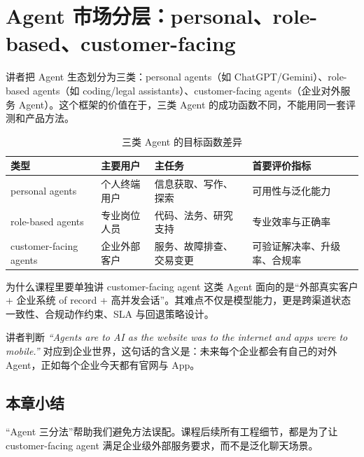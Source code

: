 \section{Agent 市场分层：personal、role-based、customer-facing}

讲者把 Agent 生态划分为三类：personal agents（如 ChatGPT/Gemini）、role-based agents（如 coding/legal assistants）、customer-facing agents（企业对外服务 Agent）。这个框架的价值在于，三类 Agent 的成功函数不同，不能用同一套评测和产品方法。

\begin{table}[H]
\centering
\caption{三类 Agent 的目标函数差异}
\begin{tabularx}{\textwidth}{>{\raggedright\arraybackslash}p{2.8cm} >{\raggedright\arraybackslash}p{3.2cm} >{\raggedright\arraybackslash}X >{\raggedright\arraybackslash}p{3.2cm}}
\toprule
类型 & 主要用户 & 主任务 & 首要评价指标 \\
\midrule
personal agents & 个人终端用户 & 信息获取、写作、探索 & 可用性与泛化能力 \\
role-based agents & 专业岗位人员 & 代码、法务、研究支持 & 专业效率与正确率 \\
customer-facing agents & 企业外部客户 & 服务、故障排查、交易变更 & 可验证解决率、升级率、合规率 \\
\bottomrule
\end{tabularx}
\end{table}

\begin{knowledgebox}{为什么课程里要单独讲 customer-facing agent}
这类 Agent 面向的是“外部真实客户 + 企业系统 of record + 高并发会话”。其难点不仅是模型能力，更是跨渠道状态一致性、合规动作约束、SLA 与回退策略设计。
\end{knowledgebox}

\begin{importantbox}{讲者判断}
\textit{``Agents are to AI as the website was to the internet and apps were to mobile.''}
对应到企业世界，这句话的含义是：未来每个企业都会有自己的对外 Agent，正如每个企业今天都有官网与 App。
\end{importantbox}

\subsection{本章小结}

“Agent 三分法”帮助我们避免方法误配。课程后续所有工程细节，都是为了让 customer-facing agent 满足企业级外部服务要求，而不是泛化聊天场景。

